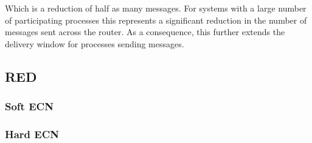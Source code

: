 Which is a reduction of half as many messages.
For systems with a large number of participating processes this represents a significant reduction in the number of messages sent across the router.
As a consequence, this further extends the delivery window for processes sending messages.


\subsection{RED}
\subsubsection{Soft \ac{ECN}}
\subsubsection{Hard \ac{ECN}}
